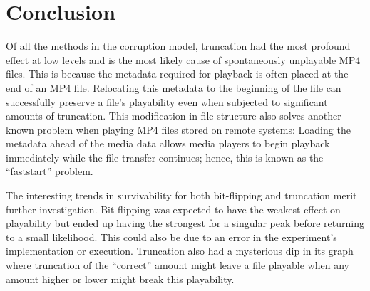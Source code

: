 \chapter{Conclusion}
\label{cha:conclusion}

Of all the methods in the corruption model, truncation had the most profound effect at low levels and is the most likely cause of spontaneously unplayable MP4 files. This is because the metadata required for playback is often placed at the end of an MP4 file. Relocating this metadata to the beginning of the file can successfully preserve a file's playability even when subjected to significant amounts of truncation. This modification in file structure also solves another known problem when playing MP4 files stored on remote systems: Loading the metadata ahead of the media data allows media players to begin playback immediately while the file transfer continues; hence, this is known as the ``faststart'' problem.

The interesting trends in survivability for both bit-flipping and truncation merit further investigation. Bit-flipping was expected to have the weakest effect on playability but ended up having the strongest for a singular peak before returning to a small likelihood. This could also be due to an error in the experiment's implementation or execution. Truncation also had a mysterious dip in its graph where truncation of the ``correct'' amount might leave a file playable when any amount higher or lower might break this playability.